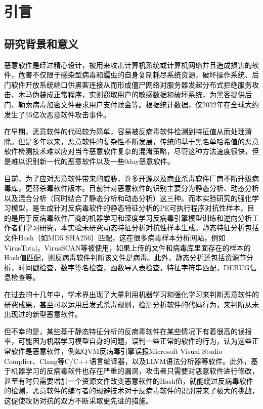 
\chapter{引言}

\section{研究背景和意义}

\textcolor{black}{恶意软件是经过精心设计，被用来攻击计算机系统或计算机网络并且造成损害的软件，危害不仅限于感染型病毒和蠕虫的自身复制耗尽系统资源，破坏操作系统、后门软件开放系统端口供黑客连接从而形成僵尸网络对服务器发起分布式拒绝服务攻击、木马伪装成正常程序，实则窃取用户的敏感数据和破坏系统，为黑客提供后门、勒索病毒加密文件要求用户支付赎金等。根据统计数据，仅2022年在全球大约发生了55亿次恶意软件攻击事件\cite{ref1}。}

\textcolor{black}{在早期，恶意软件的代码较为简单，容易被反病毒软件检测到特征值从而处理清除。但是多年以来，恶意软件的复杂性不断发展，传统的基于黑名单哈希值的恶意软件检测技术难以应对当今恶意软件复杂的混淆策略，尽管这种方法速度很快，但是难以识别新一代的恶意软件以及一些0day恶意软件\cite{ref2}。}

\textcolor{black}{目前，为了应对恶意软件带来的威胁，许多开源以及商业杀毒软件厂商不断升级病毒库，更替杀毒软件版本。目前针对恶意软件的识别主要分为静态分析、动态分析以及混合分析（同时结合了静态分析和动态分析）这三种。而本实验研究的强化学习模型，是生成针对反病毒软件的静态特征分析的PE可执行程序对抗性样本，目的是用于反病毒软件厂商的机器学习和深度学习反病毒引擎模型训练和逆向分析工作者们学习研究，本实验未研究动态特征分析对抗性样本生成。静态特征分析包括文件Hash（如MD5 SHA256）匹配，这在很多病毒样本分析网站，例如VirusTotal，VirusSCAN等被使用，如果上传的文件和病毒库里面存在的样本的Hash值匹配，则反病毒软件判断该文件是病毒。此外，静态分析还包括资源节分析，时间戳检查，数字签名检查，函数导入表检查，特征字符串匹配，DEBUG信息检查等。}

\textcolor{black}{在过去的十几年中，学术界出现了大量利用机器学习和强化学习来判断恶意软件的研究成果\cite{ref3}\cite{ref4}\cite{ref5}\cite{ref6}\cite{ref7}\cite{ref8}，甚至可以运用启发式杀毒规则，检测分析软件的代码行为，来判断从未出现过的新型恶意软件。}

\textcolor{black}{但不幸的是，某些基于静态特征分析的反病毒软件在某些情况下有着很高的误报率，可能因为机器学习模型自身的问题，误判一些正常的软件的行为，认为这些正常软件是恶意软件，例如QVM反病毒引擎误报Microsoft Visual Studio Complier、Clang等C/C++语言编译器，以及LLVM语法分析器等软件。此外，基于机器学习的反病毒软件也存在严重的漏洞，攻击者只需要对恶意软件进行修改，甚至有时只需要增加一个资源文件改变恶意软件的Hash值，就能绕过反病毒软件的检测，恶意软件的编写者的规避技术对于反病毒软件的识别带来了极大的挑战，这促使攻防对抗的双方不断采取更先进的措施。}

